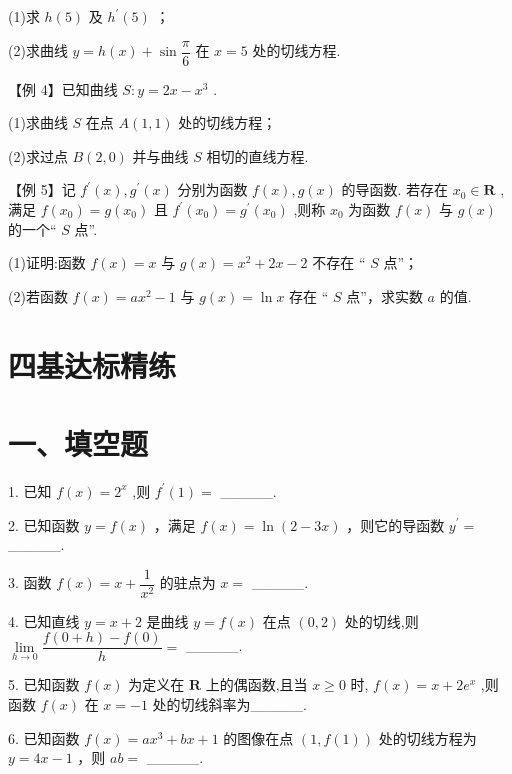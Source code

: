 (1)求 $h\left( 5\right)$ 及 ${h}^{\prime }\left( 5\right)$ ；

(2)求曲线 $y = h\left( x\right)  + \sin \dfrac{\pi }{6}$ 在 $x = 5$ 处的切线方程.

【例 4】已知曲线 $S : y = {2x} - {x}^{3}$ .

(1)求曲线 $S$ 在点 $A\left( {1,1}\right)$ 处的切线方程；

(2)求过点 $B\left( {2,0}\right)$ 并与曲线 $S$ 相切的直线方程.


【例 5】记 ${f}^{\prime }\left( x\right) ,{g}^{\prime }\left( x\right)$ 分别为函数 $f\left( x\right) ,g\left( x\right)$ 的导函数. 若存在 ${x}_{0} \in  \mathbf{R}$ ,满足 $f\left( {x}_{0}\right)  = g\left( {x}_{0}\right)$ 且 ${f}^{\prime }\left( {x}_{0}\right)  = {g}^{\prime }\left( {x}_{0}\right)$ ,则称 ${x}_{0}$ 为函数 $f\left( x\right)$ 与 $g\left( x\right)$ 的一个“ $S$ 点”.

(1)证明:函数 $f\left( x\right)  = x$ 与 $g\left( x\right)  = {x}^{2} + {2x} - 2$ 不存在 “ $S$ 点”；

(2)若函数 $f\left( x\right)  = a{x}^{2} - 1$ 与 $g\left( x\right)  = \ln x$ 存在 “ $S$ 点”，求实数 $a$ 的值.

\section*{四基达标精练}

\section*{一、填空题}

1. 已知 $f\left( x\right)  = {2}^{x}$ ,则 ${f}^{\prime }\left( 1\right)  =$ \_\_\_\_\_.

2. 已知函数 $y = f\left( x\right)$ ，满足 $f\left( x\right)  = \ln \left( {2 - {3x}}\right)$ ，则它的导函数 ${y}^{\prime } =$ \_\_\_\_\_.

3. 函数 $f\left( x\right)  = x + \dfrac{1}{{x}^{2}}$ 的驻点为 $x =$ \_\_\_\_\_.

4. 已知直线 $y = x + 2$ 是曲线 $y = f\left( x\right)$ 在点 $\left( {0,2}\right)$ 处的切线,则 $\mathop{\lim }\limits_{{h \rightarrow  0}}\dfrac{f\left( {0 + h}\right)  - f\left( 0\right) }{h} =$ \_\_\_\_\_.

5. 已知函数 $f\left( x\right)$ 为定义在 $\mathbf{R}$ 上的偶函数,且当 $x \geq  0$ 时, $f\left( x\right)  = x + 2{e}^{x}$ ,则函数 $f\left( x\right)$ 在 $x =  - 1$ 处的切线斜率为\_\_\_\_\_.

6. 已知函数 $f\left( x\right)  = a{x}^{3} + {bx} + 1$ 的图像在点 $\left( {1,f\left( 1\right) }\right)$ 处的切线方程为 $y = {4x} - 1$ ，则 ${ab} =$ \_\_\_\_\_.


